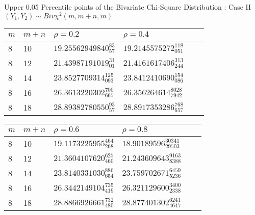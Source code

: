 \documentclass{slides}
\begin{document}
\begin{slide}
\renewcommand{\arraystretch}{1.5}
\begin{center}
Upper 0.05 Percentile points of the Bivariate Chi-Square Distribution
: Case II \\
$(Y_1, Y_2) \sim Biv \chi^2(m,m+n,m)$
\end{center}

\begin{center}
\begin{tabular}{l|l|l|l|l|l}
$ m $ & $m+n$ & $\rho=0.2$ & $\rho=0.4$ \\ \hline
8 & 10 & $19.25562949840_{57}^{83}$ &  $19.2145575272_{051}^{118}$ \\ 

8 & 12 & $21.43987191019_{01}^{31}$ & $21.4161617406_{244}^{313}$ \\

8 & 14 & $23.8527709314_{093}^{125}$ & $23.8412410690_{086}^{154}$ \\

8 & 16 & $26.3613220302_{665}^{700}$ & $26.356264614_{7942}^{8028}$ \\

8 & 18 & $28.89382780550_{57}^{93}$ & $28.8917353286_{657}^{768}$ \\
\end{tabular}

\begin{tabular}{l|l|l|l|l|l}
$ m $ & $m+n$ & $\rho=0.6$ &  $\rho=0.8$ \\ \hline
8 & 10 & $19.1173225955_{268}^{464}$ & $18.90189596_{29503}^{30341}$ \\ 

8 & 12 & $21.3604107620_{460}^{625}$ & $21.243609643_{8388}^{9163}$ \\

8 & 14 & $23.8140331030_{654}^{886}$ & $23.759702671_{5236}^{6459}$ \\

8 & 16 & $26.3442149104_{419}^{735}$ & $26.321129600_{2338}^{3400}$ \\

8 & 18 & $28.8866926661_{480}^{732}$ & $28.877401302_{4647}^{6241}$ \\
\end{tabular}

\end{center}

\end{slide}
\end{document}

